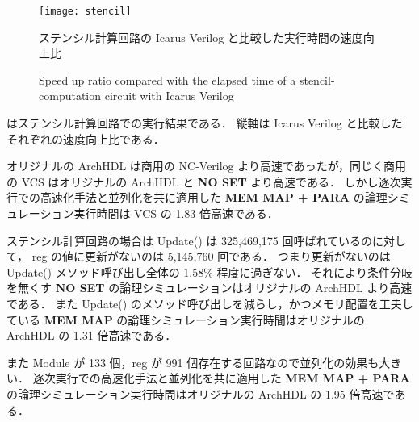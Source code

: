 \fi

\begin{figure}[tb]
 \centering
 \texttt{[image: stencil]}
 \caption{ステンシル計算回路の Icarus Verilog と比較した実行時間の速度向上比}
\fi
 \caption{Speed up ratio compared with the elapsed time of a stencil-computation circuit with Icarus Verilog}
 \label{fig:stencil}
\end{figure}

 はステンシル計算回路での実行結果である．
縦軸は Icarus Verilog と比較したそれぞれの速度向上比である．

オリジナルの ArchHDL は商用の NC-Verilog より高速であったが，同じく商用の VCS はオリジナルの ArchHDL と \textbf{NO SET} より高速である．
しかし逐次実行での高速化手法と並列化を共に適用した \textbf{MEM MAP + PARA} の論理シミュレーション実行時間は VCS の 1.83 倍高速である．

ステンシル計算回路の場合は Update() は 325,469,175 回呼ばれているのに対して，
reg の値に更新がないのは 5,145,760 回である．
つまり更新がないのは Update() メソッド呼び出し全体の $1.58\%$ 程度に過ぎない．
それにより条件分岐を無くす \textbf{NO SET} の論理シミュレーションはオリジナルの ArchHDL より高速である．
また Update() のメソッド呼び出しを減らし，かつメモリ配置を工夫している \textbf{MEM MAP} の論理シミュレーション実行時間はオリジナルの ArchHDL の 1.31 倍高速である．

また Module が 133 個，reg が 991 個存在する回路なので並列化の効果も大きい．
逐次実行での高速化手法と並列化を共に適用した \textbf{MEM MAP + PARA} の論理シミュレーション実行時間はオリジナルの ArchHDL の 1.95 倍高速である．



